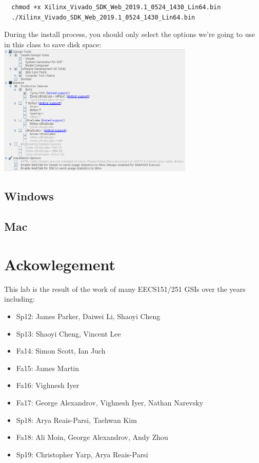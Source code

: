 \documentclass[11pt]{article}
\begin{document}
\begin{verbatim}
  chmod +x Xilinx_Vivado_SDK_Web_2019.1_0524_1430_Lin64.bin
  ./Xilinx_Vivado_SDK_Web_2019.1_0524_1430_Lin64.bin
\end{verbatim}

During the install process, you should only select the options we're going to use in this class to save disk space:
\includegraphics[width=0.7\textwidth]{figs/vivado_install_options.png}

\subsection{Windows}

\subsection{Mac}

\section*{Ackowlegement}
This lab is the result of the work of many EECS151/251 GSIs over the years including:
\begin{itemize}
\item Sp12: James Parker, Daiwei Li, Shaoyi Cheng
\item Sp13: Shaoyi Cheng, Vincent Lee
\item Fa14: Simon Scott, Ian Juch
\item Fa15: James Martin
\item Fa16: Vighnesh Iyer
\item Fa17: George Alexandrov, Vighnesh Iyer, Nathan Narevsky
\item Sp18: Arya Reais-Parsi, Taehwan Kim
\item Fa18: Ali Moin, George Alexandrov, Andy Zhou
\item Sp19: Christopher Yarp, Arya Reais-Parsi
\end{itemize}
\end{document}
